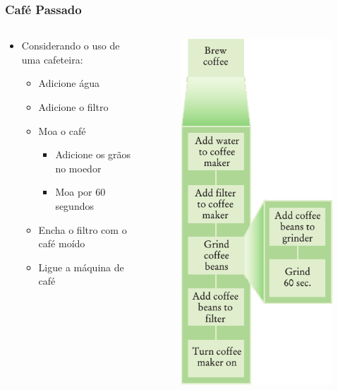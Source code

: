 \documentclass[xcolor={dvipsnames,table},aspectratio=169]{beamer}
\begin{document}
\begin{frame}\frametitle{Café Passado}
\begin{columns}[T]
	\begin{column}{0.3\linewidth}
		\begin{itemize}
		\item Considerando o uso de uma cafeteira:
		\begin{itemize}
			\item Adicione água
			\item Adicione o filtro
			\item Moa o café
			\begin{itemize}
				\item Adicione os grãos no moedor
				\item Moa por 60 segundos
			\end{itemize}
			\item Encha o filtro com o café moído
			\item Ligue a máquina de café
		\end{itemize}
		\end{itemize}
	\end{column}
	\begin{column}{0.7\linewidth}\begin{figure}[h]
	\includegraphics[height=0.65\paperheight,center]{pucrs-ep-fprog-unidade_05-metodos-laminas-get_coffe_3.png}

\end{figure}
\end{column}
\end{columns}
\end{frame}
\end{document}
